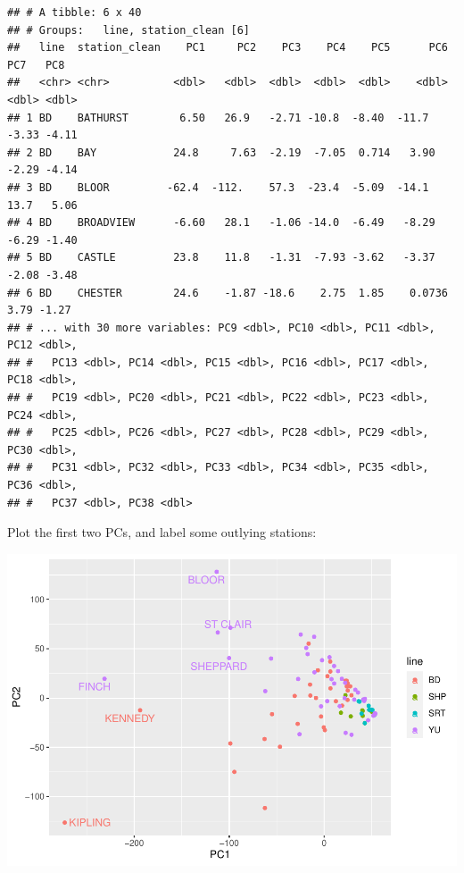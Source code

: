\documentclass[
]{book}
\newenvironment{Shaded}{\begin{snugshade}}{\end{snugshade}}
\newcommand{\DataTypeTok}[1]{\textcolor[rgb]{0.13,0.29,0.53}{#1}}
\newcommand{\DecValTok}[1]{\textcolor[rgb]{0.00,0.00,0.81}{#1}}
\newcommand{\KeywordTok}[1]{\textcolor[rgb]{0.13,0.29,0.53}{\textbf{#1}}}
\newcommand{\NormalTok}[1]{#1}
\newcommand{\OperatorTok}[1]{\textcolor[rgb]{0.81,0.36,0.00}{\textbf{#1}}}
\newcommand{\StringTok}[1]{\textcolor[rgb]{0.31,0.60,0.02}{#1}}
\begin{document}
\begin{verbatim}
## # A tibble: 6 x 40
## # Groups:   line, station_clean [6]
##   line  station_clean    PC1     PC2    PC3    PC4    PC5      PC6   PC7   PC8
##   <chr> <chr>          <dbl>   <dbl>  <dbl>  <dbl>  <dbl>    <dbl> <dbl> <dbl>
## 1 BD    BATHURST        6.50   26.9   -2.71 -10.8  -8.40  -11.7    -3.33 -4.11
## 2 BD    BAY            24.8     7.63  -2.19  -7.05  0.714   3.90   -2.29 -4.14
## 3 BD    BLOOR         -62.4  -112.    57.3  -23.4  -5.09  -14.1    13.7   5.06
## 4 BD    BROADVIEW      -6.60   28.1   -1.06 -14.0  -6.49   -8.29   -6.29 -1.40
## 5 BD    CASTLE         23.8    11.8   -1.31  -7.93 -3.62   -3.37   -2.08 -3.48
## 6 BD    CHESTER        24.6    -1.87 -18.6    2.75  1.85    0.0736  3.79 -1.27
## # ... with 30 more variables: PC9 <dbl>, PC10 <dbl>, PC11 <dbl>, PC12 <dbl>,
## #   PC13 <dbl>, PC14 <dbl>, PC15 <dbl>, PC16 <dbl>, PC17 <dbl>, PC18 <dbl>,
## #   PC19 <dbl>, PC20 <dbl>, PC21 <dbl>, PC22 <dbl>, PC23 <dbl>, PC24 <dbl>,
## #   PC25 <dbl>, PC26 <dbl>, PC27 <dbl>, PC28 <dbl>, PC29 <dbl>, PC30 <dbl>,
## #   PC31 <dbl>, PC32 <dbl>, PC33 <dbl>, PC34 <dbl>, PC35 <dbl>, PC36 <dbl>,
## #   PC37 <dbl>, PC38 <dbl>
\end{verbatim}

Plot the first two PCs, and label some outlying stations:

\begin{Shaded}
\end{Shaded}

\includegraphics{telling_stories_with_data_files/figure-latex/unnamed-chunk-271-1.pdf}
\end{document}
